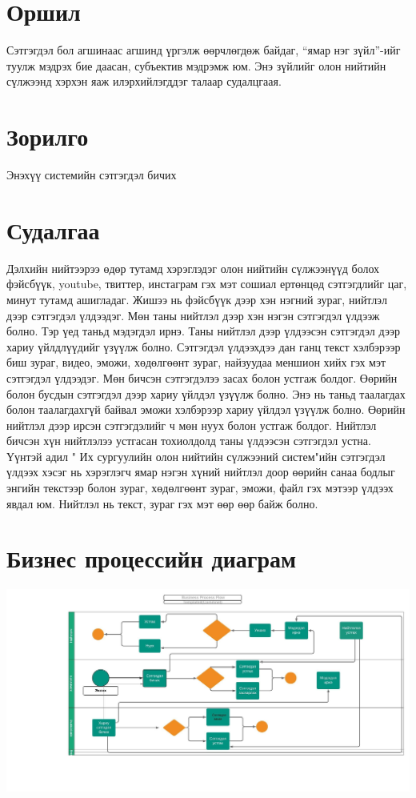 \documentclass[12pt]{article}
\begin{document}
	\tableofcontents
	\newpage
	
	
	
	
	
	\section{Оршил}
	
	Сэтгэгдэл бол агшинаас агшинд үргэлж өөрчлөгдөж байдаг, “ямар нэг зүйл”-ийг туулж мэдрэх бие даасан, субъектив мэдрэмж юм.  Энэ зүйлийг олон нийтийн сүлжээнд хэрхэн яаж илэрхийлэгддэг талаар судалцгаая.
	\section{Зорилго}
	Энэхүү системийн сэтгэгдэл бичих 
	
	\section{Судалгаа}
	Дэлхийн нийтээрээ өдөр тутамд хэрэглэдэг олон нийтийн сүлжээнүүд болох фэйсбүүк, youtube, твиттер, инстаграм гэх мэт сошиал ертөнцөд сэтгэгдлийг цаг, минут тутамд ашигладаг. Жишээ нь фэйсбүүк дээр хэн нэгний зураг, нийтлэл дээр сэтгэгдэл үлдээдэг. Мөн таны нийтлэл дээр хэн нэгэн сэтгэгдэл үлдээж болно. Тэр үед таньд мэдэгдэл ирнэ. Таны нийтлэл дээр үлдээсэн сэтгэгдэл дээр хариу үйлдлүүдийг үзүүлж болно. Сэтгэгдэл үлдээхдээ дан ганц текст хэлбэрээр биш зураг, видео, эможи, хөдөлгөөнт зураг, найзуудаа меншион хийх гэх мэт сэтгэгдэл үлдээдэг. Мөн бичсэн сэтгэгдэлээ засах болон устгаж болдог. Өөрийн болон бусдын сэтгэгдэл дээр хариу үйлдэл үзүүлж болно. Энэ нь таньд таалагдах болон таалагдахгүй байвал эможи хэлбэрээр хариу үйлдэл үзүүлж болно. Өөрийн нийтлэл дээр ирсэн сэтгэгдэлийг ч мөн нуух болон устгаж болдог. Нийтлэл бичсэн хүн нийтлэлээ устгасан тохиолдолд таны үлдээсэн сэтгэгдэл устна. Үүнтэй адил " Их сургуулийн олон нийтийн сүлжээний систем"ийн сэтгэгдэл үлдээх хэсэг нь хэрэглэгч ямар нэгэн хүний нийтлэл доор өөрийн санаа бодлыг энгийн текстээр болон зураг, хөдөлгөөнт зураг, эможи, файл гэх мэтээр үлдээх явдал юм. Нийтлэл нь текст, зураг гэх мэт өөр өөр байж болно. 
	\section{Бизнес процессийн диаграм}
	\includegraphics[scale=0.5]{BPDiagram} 
\end{document}
